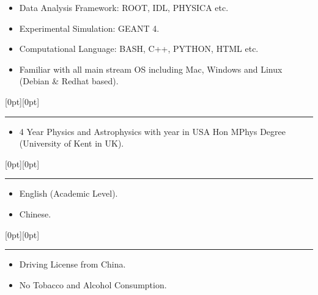 \documentclass[a4paper,12pt]{letter}
\begin{document}
\begin{itemize}
\item \textrm{\normalsize Data Analysis Framework: ROOT, IDL, PHYSICA etc.}
\item \textrm{\normalsize Experimental Simulation: GEANT 4.}
\item \textrm{\normalsize Computational Language: BASH, C++, PYTHON, HTML etc.}
\item \textrm{\normalsize Familiar with all main stream OS including Mac, Windows and Linux (Debian \& Redhat based).}
\end{itemize}

\raisebox{0pt}[0pt][0pt]{\Large\textbf{\raisebox{-3.5ex}{Qualification}}} 

\rule[-0.5cm]{10cm}{1pt}
\begin{itemize}
\item \textrm{\normalsize 4 Year Physics and Astrophysics with year in USA Hon MPhys Degree (University of Kent in UK).}
\end{itemize}

\raisebox{0pt}[0pt][0pt]{\Large\textbf{\raisebox{-3.5ex}{Language Skill}}} 

\rule[-0.5cm]{10cm}{1pt}
\begin{itemize}
\item \textrm{\normalsize English (Academic Level).}
\item \textrm{\normalsize Chinese.}
\end{itemize}

\raisebox{0pt}[0pt][0pt]{\Large\textbf{\raisebox{-3.5ex}{Additional Information}}} 

\rule[-0.5cm]{10cm}{1pt}
\begin{itemize}
\item \textrm{\normalsize Driving License from China.}
\item \textrm{\normalsize No Tobacco and Alcohol Consumption.}
\end{itemize}

\vspace{0.5cm}
\end{document}
